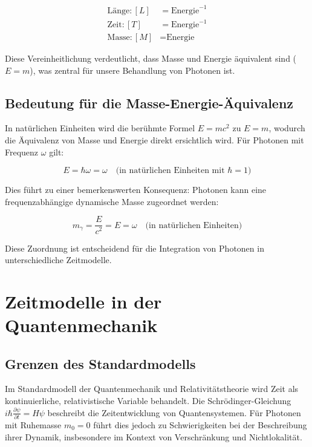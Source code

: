 \documentclass[a4paper,12pt]{article}
\begin{document}
	\begin{align}
		\text{Länge}: [L] &= \text{Energie}^{-1} \\
		\text{Zeit}: [T] &= \text{Energie}^{-1} \\
		\text{Masse}: [M] &= \text{Energie}
	\end{align}
	
	Diese Vereinheitlichung verdeutlicht, dass Masse und Energie äquivalent sind ($E = m$), was zentral für unsere Behandlung von Photonen ist.
	
	\subsection{Bedeutung für die Masse-Energie-Äquivalenz}
	In natürlichen Einheiten wird die berühmte Formel $E = mc^2$ zu $E = m$, wodurch die Äquivalenz von Masse und Energie direkt ersichtlich wird. Für Photonen mit Frequenz $\omega$ gilt:
	
	\begin{equation}
		E = \hbar\omega = \omega \quad \text{(in natürlichen Einheiten mit $\hbar = 1$)}
	\end{equation}
	
	Dies führt zu einer bemerkenswerten Konsequenz: Photonen kann eine frequenzabhängige dynamische Masse zugeordnet werden:
	
	\begin{equation}
		m_{\gamma} = \frac{E}{c^2} = E = \omega \quad \text{(in natürlichen Einheiten)}
	\end{equation}
	
	Diese Zuordnung ist entscheidend für die Integration von Photonen in unterschiedliche Zeitmodelle.
	
	\section{Zeitmodelle in der Quantenmechanik}
	\subsection{Grenzen des Standardmodells}
	Im Standardmodell der Quantenmechanik und Relativitätstheorie wird Zeit als kontinuierliche, relativistische Variable behandelt. Die Schrödinger-Gleichung $i\hbar\frac{\partial\psi}{\partial t} = H\psi$ beschreibt die Zeitentwicklung von Quantensystemen. Für Photonen mit Ruhemasse $m_0 = 0$ führt dies jedoch zu Schwierigkeiten bei der Beschreibung ihrer Dynamik, insbesondere im Kontext von Verschränkung und Nichtlokalität.
	
\end{document}
